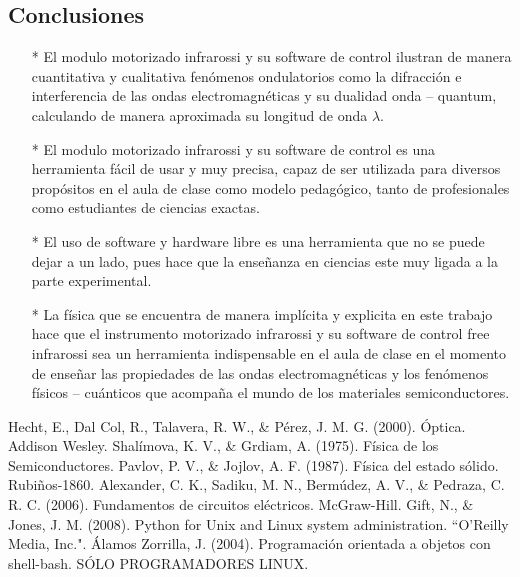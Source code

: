 \documentclass[12]{article}
\begin{document}
\begin{multicols}{2}
\section{Conclusiones}
\begin{enumerate}
\item[*] El modulo motorizado infrarossi y su software de control ilustran de manera cuantitativa y cualitativa fenómenos ondulatorios como la difracción e interferencia de las ondas electromagnéticas y su dualidad onda – quantum, calculando de manera aproximada su longitud de onda $\lambda$.   
\item[*] El modulo motorizado infrarossi y su software de control es una herramienta fácil de usar y muy precisa, capaz de ser utilizada para diversos propósitos en el aula de clase como modelo pedagógico,  tanto de profesionales como estudiantes de ciencias exactas.
\item[*] El uso de software y hardware libre es una herramienta que no se puede dejar a un lado, pues hace que la enseñanza en ciencias este muy ligada a la parte experimental.
\item[*] La física que se encuentra de manera implícita y explicita en este trabajo hace que el instrumento motorizado infrarossi y su software de control free infrarossi sea un herramienta indispensable  en el aula de clase en el momento de enseñar las  propiedades de las ondas electromagnéticas y los fenómenos físicos – cuánticos  que acompaña el mundo de los materiales  semiconductores.
\end{enumerate}
\begin{thebibliography}{99}
 Hecht, E., Dal Col, R., Talavera, R. W., \& Pérez, J. M. G. (2000). Óptica. Addison Wesley.
 Shalímova, K. V., \& Grdiam, A. (1975). Física de los Semiconductores.
 Pavlov, P. V., \& Jojlov, A. F. (1987). Física del estado sólido. Rubiños-1860.
 Alexander, C. K., Sadiku, M. N., Bermúdez, A. V., \& Pedraza, C. R. C. (2006). Fundamentos de circuitos eléctricos. McGraw-Hill. 
 Gift, N., \& Jones, J. M. (2008). Python for Unix and Linux system administration. ``O'Reilly Media, Inc.".
 Álamos Zorrilla, J. (2004). Programación orientada a objetos con shell-bash. SÓLO PROGRAMADORES LINUX.
\end{thebibliography}
\end{multicols}
\end{document}
